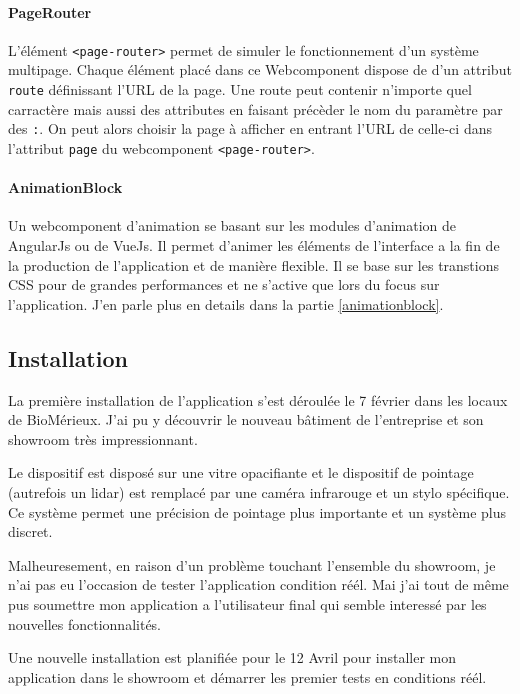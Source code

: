 \paragraph{PageRouter} L'élément \texttt{<page-router>} permet de simuler le fonctionnement d'un système multipage.
Chaque élément placé dans ce Webcomponent dispose de d'un attribut \texttt{route} définissant l'URL de la page.
Une route peut contenir n'importe quel carractère mais aussi des attributes en faisant précèder le nom du paramètre par des \texttt{:}.
On peut alors choisir la page à afficher en entrant l'URL de celle-ci dans l'attribut \texttt{page} du webcomponent \texttt{<page-router>}.

\paragraph{AnimationBlock} Un webcomponent d'animation se basant sur les modules d'animation de AngularJs ou de VueJs.
Il permet d'animer les éléments de l'interface a la fin de la production de l'application et de manière flexible.
Il se base sur les transtions CSS pour de grandes performances et ne s'active que lors du focus sur l'application.
J'en parle plus en details dans la partie \ref{animationblock}.

\subsection{Installation}
\label{bmxinstallation}

La première installation de l'application s'est déroulée le 7 février dans les locaux de BioMérieux.
J'ai pu y découvrir le nouveau bâtiment de l'entreprise et son showroom très impressionnant.

Le dispositif est disposé sur une vitre opacifiante et le dispositif de pointage (autrefois un lidar) est remplacé par une caméra infrarouge et un stylo spécifique.
Ce système permet une précision de pointage plus importante et un système plus discret.

Malheuresement, en raison d'un problème touchant l'ensemble du showroom, je n'ai pas eu l'occasion de tester l'application condition réél.
Mai j'ai tout de même pus soumettre mon application a l'utilisateur final qui semble interessé par les nouvelles fonctionnalités.

Une nouvelle installation est planifiée pour le 12 Avril pour installer mon application dans le showroom et démarrer les premier tests en conditions réél.

